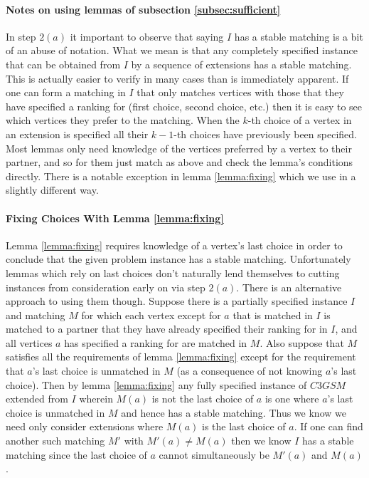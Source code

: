 \paragraph{Notes on using lemmas of subsection \ref{subsec:sufficient}}
In step $2(a)$ it important to observe that saying $I$ has a stable matching is a bit of an abuse of notation. What we mean is that any completely specified instance that can be obtained from $I$ by a sequence of extensions has a stable matching. This is actually easier to verify in many cases than is immediately apparent. If one can form a matching in $I$ that only matches vertices with those that they have specified a ranking for (first choice, second choice, etc.) then it is easy to see which vertices they prefer to the matching. When the $k$-th choice of a vertex in an extension is specified all their $k-1$-th choices have previously been specified. Most lemmas only need knowledge of the vertices preferred by a vertex to their partner, and so for them just match as above and check the lemma's conditions directly. There is a notable exception in lemma \ref{lemma:fixing} which we use in a slightly different way.
\paragraph{Fixing Choices With Lemma \ref{lemma:fixing}}
Lemma \ref{lemma:fixing} requires knowledge of a vertex's last choice in order to conclude that the given problem instance has a stable matching. Unfortunately lemmas which rely on last choices don't naturally lend themselves to cutting instances from consideration early on via step $2(a)$. There is an alternative approach to using them though. Suppose there is a partially specified instance $I$ and matching $M$ for which each vertex except for $a$ that is matched in $I$ is matched to a partner that they have already specified their ranking for in $I$, and all vertices $a$ has specified a ranking for are matched in $M$. Also suppose that $M$ satisfies all the requirements of lemma \ref{lemma:fixing} except for the requirement that $a$'s last choice is unmatched in $M$ (as a consequence of not knowing $a$'s last choice). Then by lemma \ref{lemma:fixing} any fully specified instance of $C3GSM$ extended from $I$ wherein $M(a)$ is not the last choice of $a$ is one where $a$'s last choice is unmatched in $M$ and hence has a stable matching. Thus we know we need only consider extensions where $M(a)$ is the last choice of $a$. If one can find another such matching $M'$ with $M'(a) \neq M(a)$ then we know $I$ has a stable matching since the last choice of $a$ cannot simultaneously be $M'(a)$ and $M(a)$.
